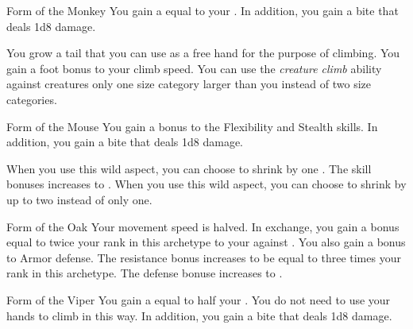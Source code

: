 {            %
            \begin{freeability}{Form of the Monkey}
                You gain a  equal to your .
                In addition, you gain a bite  that deals 1d8 damage.

                \rankline
                 You grow a tail that you can use as a free hand for the purpose of climbing.
                 You gain a  foot bonus to your climb speed.
                 You can use the \textit{creature climb} ability against creatures only one size category larger than you instead of two size categories.
            \end{freeability}

            \begin{freeability}{Form of the Mouse}
                You gain a  bonus to the Flexibility and Stealth skills.
                In addition, you gain a bite  that deals 1d8 damage.
                
                \rankline
                 When you use this wild aspect, you can choose to shrink by one .
                 The skill bonuses increases to .
                 When you use this wild aspect, you can choose to shrink by up to two  instead of only one.
            \end{freeability}

            \begin{freeability}{Form of the Oak}
                Your movement speed is halved.
                In exchange, you gain a bonus equal to twice your rank in this archetype to your  against .
                \rankline
                 You also gain a  bonus to Armor defense.
                 The resistance bonus increases to be equal to three times your rank in this archetype.
                 The defense bonuse increases to .
            \end{freeability}

            \begin{freeability}{Form of the Viper}
                You gain a  equal to half your .
                You do not need to use your hands to climb in this way.
                In addition, you gain a bite  that deals 1d8 damage.


\end{freeability}}
